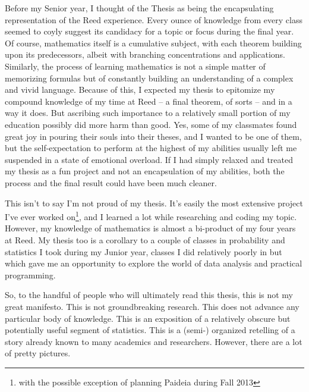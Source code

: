 \documentclass[12pt,twoside]{reedthesis}
\begin{document}
	Before my Senior year, I thought of the Thesis as being the encapsulating representation of the Reed experience. Every ounce of knowledge from every class seemed to coyly suggest its candidacy for a topic or focus during the final year. Of course, mathematics itself is a cumulative subject, with each theorem building upon its predecessors, albeit with branching concentrations and applications. Similarly, the process of learning mathematics is not a simple matter of memorizing formulas but of constantly building an understanding of a complex and vivid language. Because of this, I expected my thesis to epitomize my compound knowledge of my time at Reed -- a final theorem, of sorts -- and in a way it does. But ascribing such importance to a relatively small portion of my education possibly did more harm than good. Yes, some of my classmates found great joy in pouring their souls into their theses, and I wanted to be one of them, but the self-expectation to perform at the highest of my abilities usually left me suspended in a state of emotional overload. If I had simply relaxed and treated my thesis as a fun project and not an encapsulation of my abilities, both the process and the final result could have been much cleaner. 
	
	This isn't to say I'm not proud of my thesis. It's easily the most extensive project I've ever worked on\footnote{with the possible exception of planning Paideia during Fall 2013}, and I learned a lot while researching and coding my topic. However, my knowledge of mathematics is almost a bi-product of my four years at Reed. My thesis too is a corollary to a couple of classes in probability and statistics I took during my Junior year, classes I did relatively poorly in but which gave me an opportunity to explore the world of data analysis and practical programming. 
	
	So, to the handful of people who will ultimately read this thesis, this is not my great manifesto. This is not groundbreaking research. This does not advance any particular body of knowledge. This is an exposition of a relatively obscure but potentially useful segment of statistics. This is a (semi-) organized retelling of a story already known to many academics and researchers. However, there are a lot of pretty pictures. 
	
	
	
	
	
    \tableofcontents
    \listoftables
    \listoffigures
\end{document}
